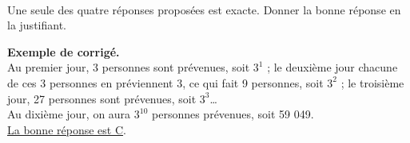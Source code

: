 \pagebreak %


\begin{activite}
   \ \\ [-16mm]
   \begin{QCM}
      Une seule des quatre réponses proposées est exacte. Donner la bonne réponse en la justifiant.
      \begin{center}
          \bigskip
      \end{center}
   \end{QCM}
   
   \bigskip
   
   \textcolor{G1}{
   {\bf Exemple de corrigé.} \\ \smallskip
      Au premier jour, 3 personnes sont prévenues, soit $3^1$ ; le deuxième jour chacune de ces 3 personnes en préviennent 3, ce qui fait 9 personnes, soit $3^2$ ; le troisième jour, 27 personnes sont prévenues, soit $3^3$\dots \\
      Au dixième jour, on aura $3^{10}$ personnes prévenues, soit 59 049. \\
      \uline{La bonne réponse est C}.}
\end{activite}

\bigskip


